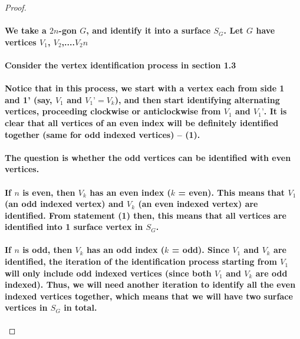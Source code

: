 \documentclass{report}
\begin{document}
\begin{proof}
{\paragraph{We take a $2n$-gon $G$, and identify it into a surface $S_G$. Let $G$ have vertices $V_1$, $V_2$,....$V_2n$}

\paragraph{Consider the vertex identification process in section 1.3}

\paragraph{Notice that in this process, we start with a vertex each from side 1 and 1’ (say, $V_1$ and $V_1’ = V_k$), and then start identifying alternating vertices, proceeding clockwise or anticlockwise from $V_1$ and $V_1’$. It is clear that all vertices of an even index will be definitely identified together (same for odd indexed vertices) -- (1).}

\paragraph{The question is whether the odd vertices can be identified with even vertices.}

\paragraph{If $n$ is even, then $V_k$ has an even index ($k$ = even). This means that $V_1$ (an odd indexed vertex) and $V_k$ (an even indexed vertex) are identified. From statement (1) then, this means that all vertices are identified into 1 surface vertex in $S_G$.}

\paragraph{If $n$ is odd, then $V_k$ has an odd index ($k$ = odd). Since $V_1$ and $V_k$ are identified, the iteration of the identification process starting from $V_1$ will only include odd indexed vertices (since both $V_1$ and $V_k$ are odd indexed). Thus, we will need another iteration to identify all the even indexed vertices together, which means that we will have two surface vertices in $S_G$ in total.}}
\end{proof}
\end{document}
